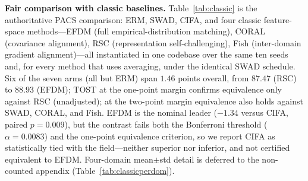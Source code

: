 \documentclass[electronics,article,submit,moreauthors]{Definitions/mdpi}
\newcommand{\add}[1]{\textcolor{addblue}{#1}}
\newcommand{\del}[1]{\textcolor{delred}{\st{#1}}}
\def\add#1{#1}
\def\del#1{}
\begin{document}
\textbf{Fair comparison with classic baselines.} Table~\ref{tab:classic} is the authoritative PACS comparison: ERM, SWAD, CIFA, and four classic feature-space methods---EFDM (full empirical-distribution matching), CORAL (covariance alignment), RSC (representation self-challenging), Fish (inter-domain gradient alignment)---all instantiated in one codebase over the same ten seeds and, for every method that uses averaging, under the identical SWAD schedule. Six of the seven arms (all but ERM) span $1.46$ points overall, from $87.47$ (RSC) to $88.93$ (EFDM); \del{CIFA's paired differences against CORAL, RSC, and Fish are all within \mbox{$\pm0.13$} point, and TOST at a one-point margin establishes equivalence after Bonferroni adjustment. EFDM is the nominal leader (\mbox{$-1.34$} versus CIFA, \mbox{$p=0.009$}), but the contrast fails the \mbox{$\alpha=0.0083$} threshold, so we report CIFA as statistically tied with the field, neither superior nor inferior.}
\add{TOST at the one-point margin confirms equivalence only against RSC (unadjusted); at the two-point margin equivalence also holds against SWAD, CORAL, and Fish. EFDM is the nominal leader ($-1.34$ versus CIFA, paired $p=0.009$), but the contrast fails both the Bonferroni threshold ($\alpha=0.0083$) and the one-point equivalence criterion, so we report CIFA as statistically tied with the field---neither superior nor inferior, and not certified equivalent to EFDM.} Four-domain mean$\pm$std detail is deferred to the non-counted appendix (Table~\ref{tab:classicperdom}).
\end{document}
